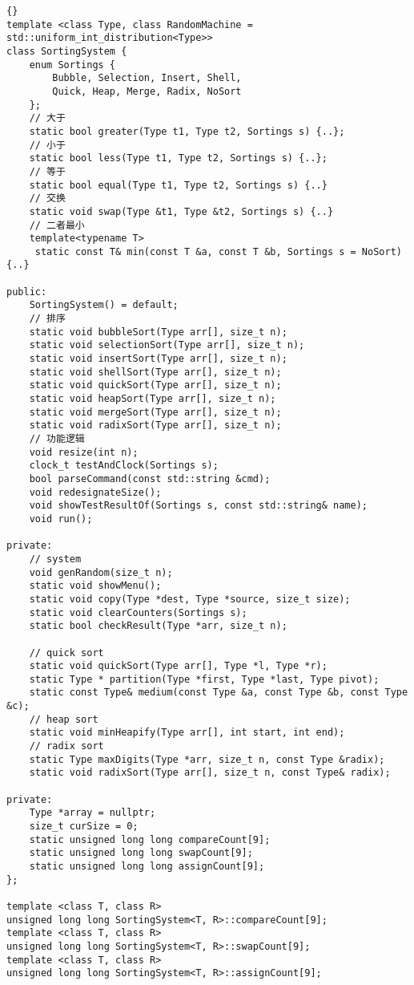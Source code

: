 \begin{lstlisting}[morendkeywords={SortingSystem}, firstnumber=8, caption=SortingSystem 类定义]{}
template <class Type, class RandomMachine = std::uniform_int_distribution<Type>>
class SortingSystem {
    enum Sortings {
        Bubble, Selection, Insert, Shell,
        Quick, Heap, Merge, Radix, NoSort
    };
    // 大于
    static bool greater(Type t1, Type t2, Sortings s) {..};
    // 小于
    static bool less(Type t1, Type t2, Sortings s) {..};
    // 等于
    static bool equal(Type t1, Type t2, Sortings s) {..}
    // 交换
    static void swap(Type &t1, Type &t2, Sortings s) {..}
    // 二者最小
    template<typename T>
     static const T& min(const T &a, const T &b, Sortings s = NoSort) {..}

public:
    SortingSystem() = default;
    // 排序
    static void bubbleSort(Type arr[], size_t n);
    static void selectionSort(Type arr[], size_t n);
    static void insertSort(Type arr[], size_t n);
    static void shellSort(Type arr[], size_t n);
    static void quickSort(Type arr[], size_t n);
    static void heapSort(Type arr[], size_t n);
    static void mergeSort(Type arr[], size_t n);
    static void radixSort(Type arr[], size_t n);
    // 功能逻辑
    void resize(int n);
    clock_t testAndClock(Sortings s);
    bool parseCommand(const std::string &cmd);
    void redesignateSize();
    void showTestResultOf(Sortings s, const std::string& name);
    void run();

private:
    // system
    void genRandom(size_t n);
    static void showMenu();
    static void copy(Type *dest, Type *source, size_t size);
    static void clearCounters(Sortings s);
    static bool checkResult(Type *arr, size_t n);

    // quick sort
    static void quickSort(Type arr[], Type *l, Type *r);
    static Type * partition(Type *first, Type *last, Type pivot);
    static const Type& medium(const Type &a, const Type &b, const Type &c);
    // heap sort
    static void minHeapify(Type arr[], int start, int end);
    // radix sort
    static Type maxDigits(Type *arr, size_t n, const Type &radix);
    static void radixSort(Type arr[], size_t n, const Type& radix);

private:
    Type *array = nullptr;
    size_t curSize = 0;
    static unsigned long long compareCount[9];
    static unsigned long long swapCount[9];
    static unsigned long long assignCount[9];
};

template <class T, class R>
unsigned long long SortingSystem<T, R>::compareCount[9];
template <class T, class R>
unsigned long long SortingSystem<T, R>::swapCount[9];
template <class T, class R>
unsigned long long SortingSystem<T, R>::assignCount[9];
\end{lstlisting}


